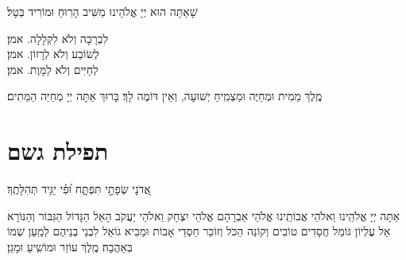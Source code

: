 \documentclass[twoside, openany, parskip=half, 11pt]{book}
\begin{document}
\begin{large}
שָׁאַתָּה הוּא יְיָ אֱלֹהֵינוּ מַשִּׁיב הָרֽוּחַ וּמוֹרִיד בְּטָל׃

לִבְרָכָה וְלֹא לִקְלָלָה. \hfill \kahal אמן׃\\
לְשׂוֹבַע וְלֹא לְרָזוֹן. \hfill \kahal אמן׃\\
לְחַיִּים וְלֹא לַמָּוֶת. \hfill \kahal אמן׃

\end{large}


מֶֽלֶךְ מֵמִית וּמְחַיֶּה וּמַצְמִֽיחַ יְשׁוּעָה, וְאֵין דּוֹמֶה לָךְ׃ בָּרוּךְ אַתָּה יְיָ מְחַיֵּה הַמֵּתִים׃





\section[תפילת גשם]{ תפילת גשם }

\label{tefilasgeshem}


\begin{small}
אֲ֭דֹנָי שְׂפָתַ֣י תִּפְתָּ֑ח וּ֝פִ֗י יַגִּ֥יד תְּהִלָּתֶֽךָ׃\\
\end{small}
אַתָּה יְיָ אֱלֹהֵֽינוּ וֵאלֹהֵי אֲבוֹתֵֽינוּ אֱלֹהֵי אַבְרָהָם אֱלֹהֵי יִצְחָק וֵאלֹהֵי יַעֲקֹב הָאֵל הַגָּדוֹל הַגִּבּוֹר וְהַנּוֹרָא אֵל עֶלְיוֹן גּוֹמֵל חֲסָדִים טוֹבִים וְקוֹנֵה הַכֹּל וְזוֹכֵר חַסְדֵי אָבוֹת וּמֵבִיא גוֹאֵל לִבְנֵי בְנֵיהֶם לְמַֽעַן שְׁמוֹ בְּאַהֲבָה׃ מֶֽלֶךְ עוֹזֵר וּמוֹשִֽׁיעַ וּמָגֵן׃

\newenvironment{nstabbing}
{\setlength{\topsep}{0pt}%
\setlength{\partopsep}{0pt}%
\tabbing}
{\endtabbing}


\end{document}

